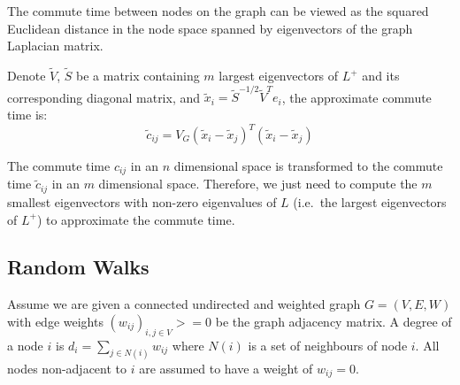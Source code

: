 \begin{comment}
An easy way to sample a graph is selecting nodes from it uniformly at random.
However, sampling in this way can break the graph geometry structure and
anomalies may not be chosen after sampling. To resolve this, we propose a
sampling strategy called component sampling. After creating the mutual
k1-nearest neighbour graph, the graph tends to have many connected components
corresponding to different data clusters.

Anomalies are likely isolated nodes or nodes in very small components. For nodes
in normal components (we have a threshold to distinguish between normal and
anomalous components), they are uniformly sampled with the same ratio
p = 50k1/n, which is chosen from preliminary experimental results. For nodes in
anomalous components, we leave all of them intact. Then we rebuild a mutual
k1-nearest neighbour graph for the sampled data. Sampling in this way will
maintain the geometry of the original graph and the relative densities of normal
clusters. Anomalies are also not discarded in this sampling strategy.

\begin{equation}
    c_{ij} = V_G(x_i - x_j)^T (x_i - x_j)
\end{equation}
\end{comment}

The commute time between nodes on the graph can be viewed as the squared
Euclidean distance in the node space spanned by eigenvectors of the graph
Laplacian matrix.

Denote $\tilde{V}$, $\tilde{S}$ be a matrix containing $m$ largest eigenvectors
of $L^+$ and its corresponding diagonal matrix, and
$\tilde{x}_i = \tilde{S}^{-1/2}\tilde{V}^Te_i$, the approximate commute time is:
\begin{equation}
    \tilde{c}_{ij} = V_G(\tilde{x}_i - \tilde{x}_j)^T(\tilde{x}_i - \tilde{x}_j)
\end{equation}

The commute time $c_{ij}$ in an $n$ dimensional space is transformed to the
commute time $\tilde{c}_{ij}$ in an $m$ dimensional space. Therefore, we just
need to compute the $m$ smallest eigenvectors with non-zero eigenvalues of $L$
(i.e.\ the largest eigenvectors of $L^+$) to approximate the commute time.

\subsection{Random Walks}
\label{randomWalks}
Assume we are given a connected undirected and weighted graph $G=(V,E,W)$ with
edge weights $(w_{ij})_{i,j \in V}>=0$ be the graph adjacency matrix. A degree
of a node $i$ is $d_i=\sum_{j\in N(i)}w_{ij}$ where $N(i)$ is a set of
neighbours of node $i$. All nodes non-adjacent to $i$ are assumed to have a
weight of $w_{ij}=0$.

